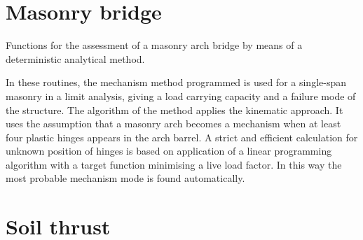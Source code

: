 \clearpage


\section{Masonry bridge}
Functions for the assessment of a masonry arch bridge by means of a deterministic analytical method.

In these routines, the mechanism method programmed is used for a single-span masonry in a limit analysis, giving a load carrying capacity and a failure mode of the structure. The algorithm of the method applies the kinematic approach. It uses the assumption that a masonry arch becomes a mechanism when at least four plastic hinges appears in the arch barrel. A strict and efficient calculation for unknown position of hinges is based on application of a linear programming algorithm with a target function minimising a live load factor. In this way the most probable mechanism mode is found automatically.

\section{Soil thrust}
